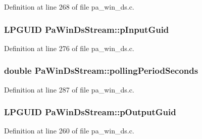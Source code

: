 Definition at line 268 of file pa\+\_\+win\+\_\+ds.\+c.

\subsubsection[{\texorpdfstring{p\+Input\+Guid}{pInputGuid}}]{\setlength{\rightskip}{0pt plus 5cm}L\+P\+G\+U\+ID Pa\+Win\+Ds\+Stream\+::p\+Input\+Guid}\hypertarget{struct_pa_win_ds_stream_a3a2980bf6763f6bd46068a95a9ccf5d0}{}\label{struct_pa_win_ds_stream_a3a2980bf6763f6bd46068a95a9ccf5d0}


Definition at line 276 of file pa\+\_\+win\+\_\+ds.\+c.

\subsubsection[{\texorpdfstring{polling\+Period\+Seconds}{pollingPeriodSeconds}}]{\setlength{\rightskip}{0pt plus 5cm}double Pa\+Win\+Ds\+Stream\+::polling\+Period\+Seconds}\hypertarget{struct_pa_win_ds_stream_afd0a02b06ef6d65c85ecefbff68976ea}{}\label{struct_pa_win_ds_stream_afd0a02b06ef6d65c85ecefbff68976ea}


Definition at line 287 of file pa\+\_\+win\+\_\+ds.\+c.

\subsubsection[{\texorpdfstring{p\+Output\+Guid}{pOutputGuid}}]{\setlength{\rightskip}{0pt plus 5cm}L\+P\+G\+U\+ID Pa\+Win\+Ds\+Stream\+::p\+Output\+Guid}\hypertarget{struct_pa_win_ds_stream_a79765ea75ed4b2c47a077db25cd9b66e}{}\label{struct_pa_win_ds_stream_a79765ea75ed4b2c47a077db25cd9b66e}


Definition at line 260 of file pa\+\_\+win\+\_\+ds.\+c.

